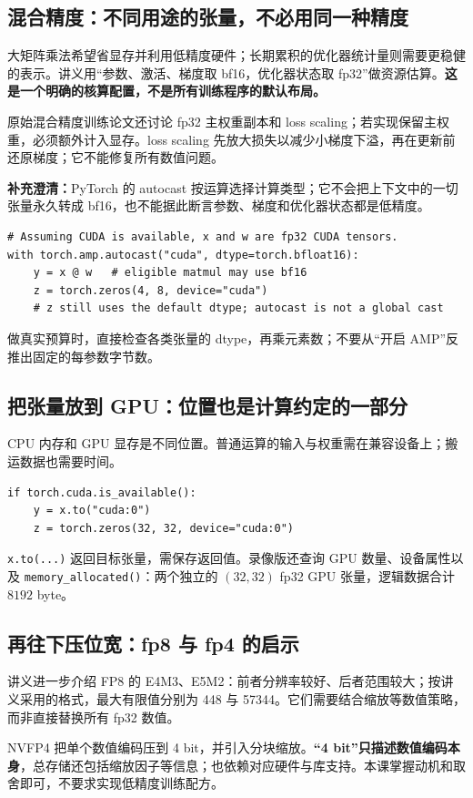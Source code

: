 \documentclass[UTF8,fontset=fandol,zihao=-4,a4paper]{ctexart}
\newcommand{\tok}[1]{\texttt{#1}}
\newcommand{\nextpage}{\clearpage}
\begin{document}
\nextpage
\subsection{混合精度：不同用途的张量，不必用同一种精度}
大矩阵乘法希望省显存并利用低精度硬件；长期累积的优化器统计量则需要更稳健的表示。讲义用“参数、激活、梯度取 bf16，优化器状态取 fp32”做资源估算。\textbf{这是一个明确的核算配置，不是所有训练程序的默认布局。}

原始混合精度训练论文还讨论 fp32 主权重副本和 loss scaling；若实现保留主权重，必须额外计入显存。loss scaling 先放大损失以减少小梯度下溢，再在更新前还原梯度；它不能修复所有数值问题。

\textbf{补充澄清：}PyTorch 的 autocast 按运算选择计算类型；它不会把上下文中的一切张量永久转成 bf16，也不能据此断言参数、梯度和优化器状态都是低精度。
\begin{lstlisting}
# Assuming CUDA is available, x and w are fp32 CUDA tensors.
with torch.amp.autocast("cuda", dtype=torch.bfloat16):
    y = x @ w   # eligible matmul may use bf16
    z = torch.zeros(4, 8, device="cuda")
    # z still uses the default dtype; autocast is not a global cast
\end{lstlisting}
做真实预算时，直接检查各类张量的 dtype，再乘元素数；不要从“开启 AMP”反推出固定的每参数字节数。

\subsection{把张量放到 GPU：位置也是计算约定的一部分}
CPU 内存和 GPU 显存是不同位置。普通运算的输入与权重需在兼容设备上；搬运数据也需要时间。
\begin{lstlisting}
if torch.cuda.is_available():
    y = x.to("cuda:0")
    z = torch.zeros(32, 32, device="cuda:0")
\end{lstlisting}
\tok{x.to(...)} 返回目标张量，需保存返回值。录像版还查询 GPU 数量、设备属性以及 \tok{memory\_allocated()}：两个独立的 $(32,32)$ fp32 GPU 张量，逻辑数据合计 $8192$ byte。

\subsection{再往下压位宽：fp8 与 fp4 的启示}
讲义进一步介绍 FP8 的 E4M3、E5M2：前者分辨率较好、后者范围较大；按讲义采用的格式，最大有限值分别为 448 与 57344。它们需要结合缩放等数值策略，而非直接替换所有 fp32 数值。

NVFP4 把单个数值编码压到 4 bit，并引入分块缩放。\textbf{“4 bit”只描述数值编码本身}，总存储还包括缩放因子等信息；也依赖对应硬件与库支持。本课掌握动机和取舍即可，不要求实现低精度训练配方。
\end{document}
